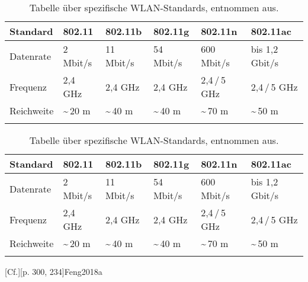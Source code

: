 
\begin{table}[htbp]
	\centering
	\renewcommand{\arraystretch}{1.2}
	\begin{tabular}{llllll}
		\hline
		{Standard} & {802.11} & {802.11b} & {802.11g} & {802.11n} & {802.11ac}\\
		\hline
		Datenrate & 2 Mbit/s & 11 Mbit/s & 54 Mbit/s & 600 Mbit/s & bis 1,2 Gbit/s \\
		Frequenz & 2,4 GHz & 2,4 GHz & 2,4 GHz & 2,4\,/\,5 GHz & 2,4\,/\,5 GHz \\
		Reichweite & \textasciitilde\,20 m & \textasciitilde\,40 m & \textasciitilde\,40 m & \textasciitilde\,70 m & \textasciitilde\,50 m \\
		\hline
		\newline
	\end{tabular}
	\renewcommand{\arraystretch}{1}
	
	\caption[Tabelle über spezifische WLAN-Standards.] {Tabelle über spezifische WLAN-Standards, entnommen aus.\footnotemark}          
	\label{tab-wifi}
	
\end{table}


\begin{table}[htbp]
	\centering
	\renewcommand{\arraystretch}{1.2}
	\begin{tabular}{llllll}
		\hline
		{Standard} & {802.11} & {802.11b} & {802.11g} & {802.11n} & {802.11ac}\\
		\hline
		Datenrate & 2 Mbit/s & 11 Mbit/s & 54 Mbit/s & 600 Mbit/s & bis 1,2 Gbit/s \\
		Frequenz & 2,4 GHz & 2,4 GHz & 2,4 GHz & 2,4\,/\,5 GHz & 2,4\,/\,5 GHz \\
		Reichweite & \textasciitilde\,20 m & \textasciitilde\,40 m & \textasciitilde\,40 m & \textasciitilde\,70 m & \textasciitilde\,50 m \\
		\hline
		\newline
	\end{tabular}
	\renewcommand{\arraystretch}{1}
	
	\caption[Tabelle über spezifische WLAN-Standards.] {Tabelle über spezifische WLAN-Standards, entnommen aus.\footnotemark}          
	\label{tab-wifi2}
	
\end{table}
[Cf.][p. 300, 234]{Feng2018a}

